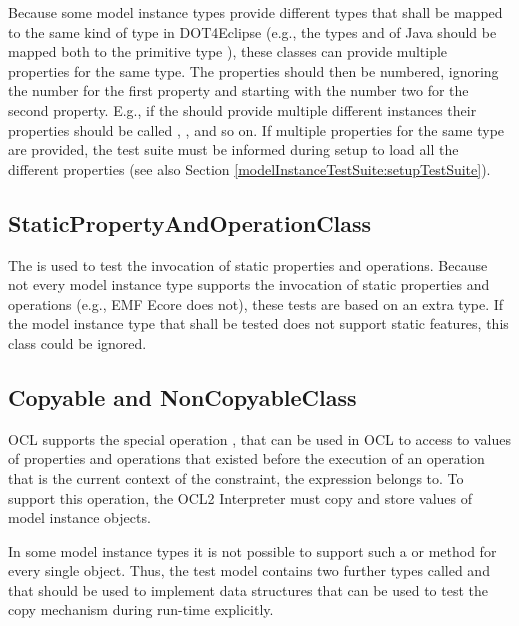 Because some model instance types provide different types that shall be mapped to the same kind of type in \acl{DOT4Eclipse} (e.g., the types  and  of Java should be mapped both to the primitive type ), these classes can provide multiple properties for the same type. The properties should then be numbered, ignoring the number for the first property and starting with the number two for the second property. E.g., if the  should provide multiple different  instances their properties should be called , ,  and so on. If multiple properties for the same type are provided, the test suite must be informed during setup to load all the different properties (see also Section \ref{modelInstanceTestSuite:setupTestSuite}).


\subsection{StaticPropertyAndOperationClass}

The  is used to test the invocation of static properties and operations. Because not every model instance type supports the invocation of static properties and operations (e.g., \acs{EMF} Ecore does not), these tests are based on an extra type. If the model instance type that shall be tested does not support static features, this class could be ignored.


\subsection{Copyable and NonCopyableClass}

\acs{OCL} supports the special operation , that can be used in \acs{OCL} to access to values of properties and operations that existed before the execution of an operation that is the current context of the constraint, the  expression belongs to. To support this operation, the \acs{OCL}2 Interpreter must copy and store values of model instance objects. 

In some model instance types it is not possible to support such a  or  method for every single object. Thus, the test model contains two further types called  and  that should be used to implement data structures that can be used to test the copy mechanism during run-time explicitly.



